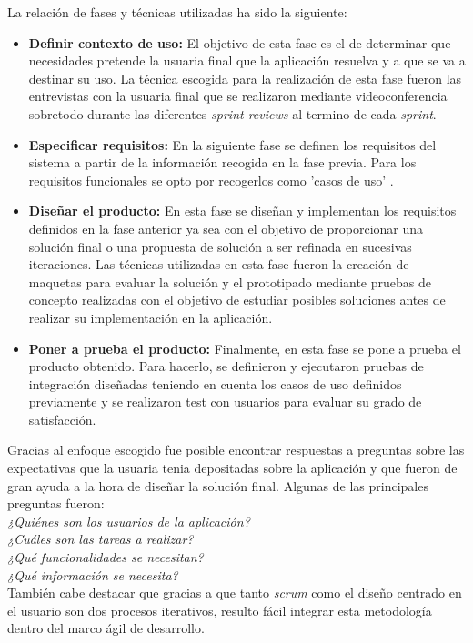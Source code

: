 \documentclass[11pt,a4paper]{article}
\begin{document}
La relación de fases y técnicas utilizadas ha sido la siguiente:

\begin{itemize}
\item \textbf{Definir contexto de uso:} El objetivo de esta fase es el de determinar que necesidades pretende la usuaria final que la aplicación resuelva y a que se va a destinar su uso. La técnica escogida para la realización de esta fase fueron las entrevistas con la usuaria final que se realizaron mediante videoconferencia sobretodo durante las diferentes \textit{sprint reviews} al termino de cada \textit{sprint}.
\item \textbf{Especificar requisitos:} En la siguiente fase se definen los requisitos del sistema a partir de la información recogida en la fase previa. Para los requisitos funcionales se opto por recogerlos como 'casos de uso' \cite{16}.
\item \textbf{Diseñar el producto:} En esta fase se diseñan y implementan los requisitos definidos en la fase anterior ya sea con el objetivo de proporcionar una solución final o una propuesta de solución a ser refinada en sucesivas iteraciones. Las técnicas utilizadas en esta fase fueron la creación de maquetas para evaluar la solución y el prototipado mediante pruebas de concepto realizadas con el objetivo de estudiar posibles soluciones antes de realizar su implementación en la aplicación.
\item \textbf{Poner a prueba el producto:} Finalmente, en esta fase se pone a prueba el producto obtenido. Para hacerlo, se definieron y ejecutaron pruebas de integración diseñadas teniendo en cuenta los casos de uso definidos previamente y se realizaron test con usuarios para evaluar su grado de satisfacción.
\end{itemize}

Gracias al enfoque escogido fue posible encontrar respuestas a preguntas sobre las expectativas que la usuaria tenia depositadas sobre la aplicación y que fueron de gran ayuda a la hora de diseñar la solución final. Algunas de las principales preguntas fueron:\\
\textit{¿Quiénes son los usuarios de la aplicación?}\\
\textit{¿Cuáles son las tareas a realizar?}\\
\textit{¿Qué funcionalidades se necesitan?}\\
\textit{¿Qué información se necesita?}
\\

También cabe destacar que gracias a que tanto \textit{scrum} como el diseño centrado en el usuario son dos procesos iterativos, resulto fácil integrar esta metodología dentro del marco ágil de desarrollo.
\medskip 
\end{document}

